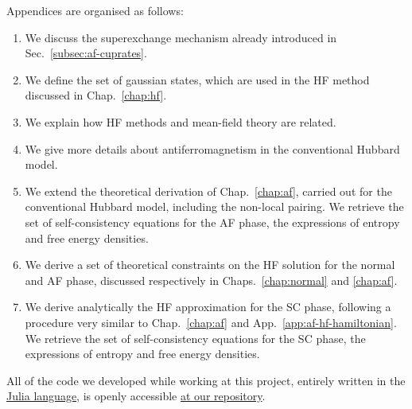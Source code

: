 Appendices are organised as follows:
\begin{enumerate}[align=left]
	\item[App.~\ref{app:superexchange-virtual-hopping}] We discuss the superexchange mechanism already introduced in Sec.~\ref{subsec:af-cuprates}. 
	\item[App.~\ref{app:slater-gaussian}] We define the set of gaussian states, which are used in the HF method discussed in Chap.~\ref{chap:hf}.
	\item[App.~\ref{app:hf-mft}] We explain how HF methods and mean-field theory are related.
	\item[App.~\ref{app:hm-af-ground-state}] We give more details about antiferromagnetism in the conventional Hubbard model.
	\item[App.~\ref{app:af-hf-hamiltonian}] We extend the theoretical derivation of Chap.~\ref{chap:af}, carried out for the conventional Hubbard model, including the non-local pairing. We retrieve the set of self-consistency equations for the AF phase, the expressions of entropy and free energy densities.
	\item[App.~\ref{app:theoretical-constraints}] We derive a set of theoretical constraints on the HF solution for the normal and AF phase, discussed respectively in Chaps.~\ref{chap:normal} and \ref{chap:af}.
	\item[App.~\ref{app:sc-hf-hamiltonian}] We  derive analytically the HF approximation for the SC phase, following a procedure very similar to Chap.~\ref{chap:af} and App.~\ref{app:af-hf-hamiltonian}. We retrieve the set of self-consistency equations for the SC phase, the expressions of entropy and free energy densities.
	\end{enumerate}
All of the code we developed while working at this project, entirely written in the \href{https://julialang.org/}{Julia language}, is openly accessible \href{https://github.com/nepero27178/EHM-HF}{at our repository}.